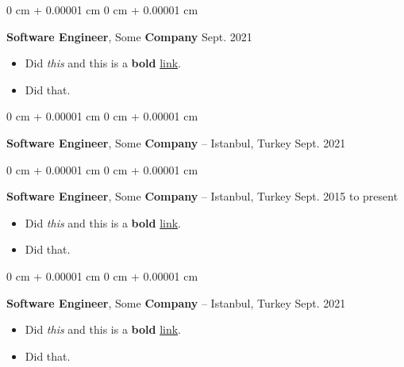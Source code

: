 \documentclass[10pt, letterpaper]{article}
\newenvironment{highlights}{
    \begin{itemize}[
        topsep=0.10 cm,
        parsep=0.10 cm,
        partopsep=0pt,
        itemsep=0pt,
        leftmargin=0 cm + 10pt
    ]
}{
    \end{itemize}
        
    \vspace{-0.20cm}
} %
\newenvironment{onecolentry}{
    \begin{adjustwidth}{
        0 cm + 0.00001 cm
    }{
        0 cm + 0.00001 cm
    }
}{
    \end{adjustwidth}
} %
\begin{document}
        \vspace{0.1 cm}

        \begin{onecolentry}
            \textbf{Software Engineer}, Some \textbf{Company} \hfill Sept. 2021
            \begin{highlights}
                \item Did \textit{this} and this is a \textbf{bold} \href{https://example.com}{link}.
                \item Did that.
            \end{highlights}
        \end{onecolentry}

        \vspace{0.1 cm}

        \begin{onecolentry}
            \textbf{Software Engineer}, Some \textbf{Company} -- Istanbul, Turkey \hfill Sept. 2021
        \end{onecolentry}

        \vspace{0.1 cm}

        \begin{onecolentry}
            \textbf{Software Engineer}, Some \textbf{Company} -- Istanbul, Turkey \hfill Sept. 2015 to present
            \begin{highlights}
                \item Did \textit{this} and this is a \textbf{bold} \href{https://example.com}{link}.
                \item Did that.
            \end{highlights}
        \end{onecolentry}

        \vspace{0.1 cm}

        \begin{onecolentry}
            \textbf{Software Engineer}, Some \textbf{Company} -- Istanbul, Turkey \hfill Sept. 2021
            \begin{highlights}
                \item Did \textit{this} and this is a \textbf{bold} \href{https://example.com}{link}.
                \item Did that.
            \end{highlights}
        \end{onecolentry}

        \vspace{0.1 cm}
\end{document}
